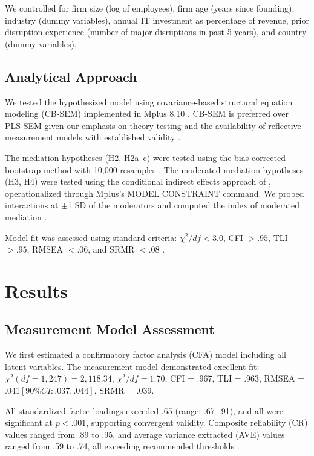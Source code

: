 \documentclass[12pt, a4paper]{article}
\begin{document}
We controlled for firm size (log of employees), firm age (years since founding), industry (dummy variables), annual IT investment as percentage of revenue, prior disruption experience (number of major disruptions in past 5 years), and country (dummy variables).

\subsection{Analytical Approach}

We tested the hypothesized model using covariance-based structural equation modeling (CB-SEM) implemented in Mplus 8.10 \citep{Muthen2017}. CB-SEM is preferred over PLS-SEM given our emphasis on theory testing and the availability of reflective measurement models with established validity \citep{Hair2019}.

The mediation hypotheses (H2, H2a--c) were tested using the bias-corrected bootstrap method with 10,000 resamples \citep{Preacher2008}. The moderated mediation hypotheses (H3, H4) were tested using the conditional indirect effects approach of \citet{Hayes2015}, operationalized through Mplus's MODEL CONSTRAINT command. We probed interactions at $\pm$1 SD of the moderators and computed the index of moderated mediation \citep{Hayes2015}.

Model fit was assessed using standard criteria: $\chi^2/df < 3.0$, CFI $> .95$, TLI $> .95$, RMSEA $< .06$, and SRMR $< .08$ \citep{Hu1999}.


\section{Results}

\subsection{Measurement Model Assessment}

We first estimated a confirmatory factor analysis (CFA) model including all latent variables. The measurement model demonstrated excellent fit: $\chi^2(df = 1,247) = 2,118.34$, $\chi^2/df = 1.70$, CFI = .967, TLI = .963, RMSEA = .041$ [90\% CI: .037, .044]$, SRMR = .039.

All standardized factor loadings exceeded .65 (range: .67--.91), and all were significant at $p < .001$, supporting convergent validity. Composite reliability (CR) values ranged from .89 to .95, and average variance extracted (AVE) values ranged from .59 to .74, all exceeding recommended thresholds \citep{Hair2017}.
\end{document}
